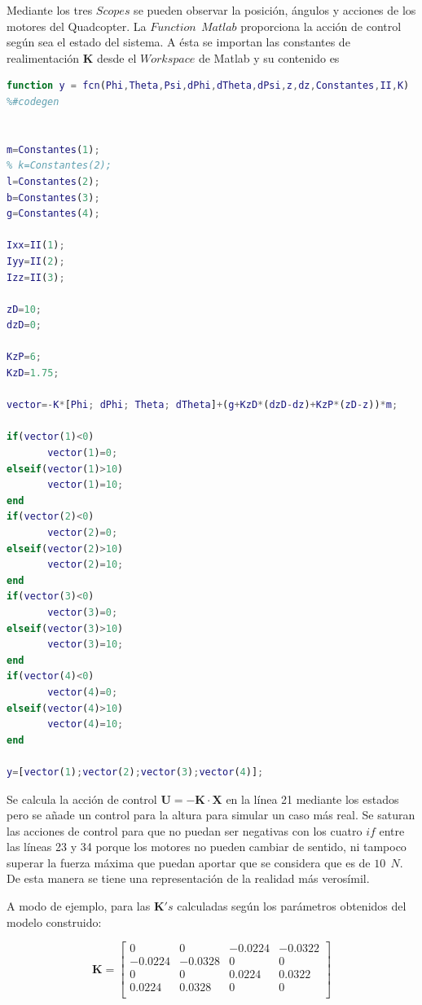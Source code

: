 \documentclass[twoside,11pt]{book}
\begin{document}
Mediante los tres $Scopes$ se pueden observar la posición, ángulos y acciones de los motores del Quadcopter. La $Function \>\> Matlab$ proporciona la acción de control según sea el estado del sistema. A ésta se importan las constantes de realimentación $\mathbf{K}$ desde el $Workspace$ de Matlab y su contenido es

\begin{lstlisting}[language=Matlab]
function y = fcn(Phi,Theta,Psi,dPhi,dTheta,dPsi,z,dz,Constantes,II,K)
%#codegen


m=Constantes(1);
% k=Constantes(2);
l=Constantes(2);
b=Constantes(3);
g=Constantes(4);

Ixx=II(1);
Iyy=II(2);
Izz=II(3);

zD=10;
dzD=0;

KzP=6;
KzD=1.75;

vector=-K*[Phi; dPhi; Theta; dTheta]+(g+KzD*(dzD-dz)+KzP*(zD-z))*m;

if(vector(1)<0) 
       vector(1)=0;
elseif(vector(1)>10)
       vector(1)=10;
end
if(vector(2)<0) 
       vector(2)=0;
elseif(vector(2)>10)
       vector(2)=10;       
end
if(vector(3)<0) 
       vector(3)=0;
elseif(vector(3)>10)
       vector(3)=10;       
end
if(vector(4)<0) 
       vector(4)=0;       
elseif(vector(4)>10)
       vector(4)=10;       
end
 
y=[vector(1);vector(2);vector(3);vector(4)];
\end{lstlisting}

Se calcula la acción de control $\mathbf{U}=-\mathbf{K} \cdot \mathbf{X}$ en la línea 21 mediante los estados pero se añade un control para la altura para simular un caso más real. Se saturan las acciones de control para que no puedan ser negativas con los cuatro $if$ entre las líneas 23 y 34 porque los motores no pueden cambiar de sentido, ni tampoco superar la fuerza máxima que puedan aportar que se considera que es de $10\>\>N$. De esta manera se tiene una representación de la realidad más verosímil. 

A modo de ejemplo, para las $\mathbf{K}'s$ calculadas según los parámetros obtenidos del modelo construido:

\begin{equation}
\mathbf{K}=\left[ \begin{array}{cccc}
         0 &         0 &  -0.0224 &  -0.0322 \\
   -0.0224 &  -0.0328    &     0  &       0 \\
         0      &   0  &  0.0224 &   0.0322 \\
    0.0224  &  0.0328  &       0    &     0 \\
\end{array} \right]
\end{equation}
\end{document}
